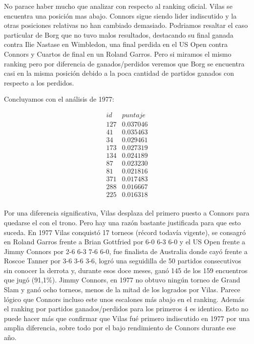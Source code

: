 No parace haber mucho que analizar con respecto al ranking oficial. Vilas se encuentra una posición mas abajo. Connors sigue siendo lider indiscutido y la otras posiciones relativas no han cambiado demasiado. Podriamos resaltar el caso particular de Borg que no tuvo malos resultados, destacando su final ganada contra Ilie Nastase en Wimbledon, una final perdida en el US Open contra Connors y Cuartos de final en un Roland Garros. Pero si miramos el mismo ranking pero por diferencia de ganados/perdidos veremos que Borg se encuentra casi en la misma posición debido a la poca cantidad de partidos ganados con respecto a los perdidos. 

Concluyamos con el análisis de 1977: 

\begin{eqnarray*}
id & puntaje \\
127 & 0.037046 \\
41 & 0.035463 \\
34 & 0.029461 \\
173 & 0.027319 \\
134 & 0.024189 \\
87 & 0.023230 \\
81 & 0.021816 \\
371 & 0.017483 \\
288 & 0.016667 \\
225 & 0.016318 \\
\end{eqnarray*}

Por una diferencia significativa, Vilas desplaza del primero puesto a Connors para quedarse el con el trono. Pero hay una razón bastante justificada para que esto suceda.
En 1977 Vilas conquistó 17 torneos (récord todavía vigente), se consagró en Roland Garros frente a Brian Gottfried por 6-0 6-3 6-0 y el US Open frente a Jimmy Connors por 2-6 6-3 7-6 6-0, fue finalista de Australia donde cayó frente a Roscoe Tanner por 3-6 3-6 3-6, logró una seguidilla de 50 partidos consecutivos sin conocer la derrota y, durante esos doce meses, ganó 145 de los 159 encuentros que jugó (91,1\%).
Jimmy Connors, en 1977 no obtuvo ningún torneo de Grand Slam y ganó ocho torneos, menos de la mitad de los logrados por Vilas. 
Parece lógico que Connors incluso este unos escalones más abajo en el ranking. Además el ranking por partidos ganados/perdidos para los primeros 4 es identico. Esto no puede hacer más que confirmar que Vilas fué primero indiscutido en 1977 por una amplia diferencia, sobre todo por el bajo rendimiento de Connors durante ese año. 

